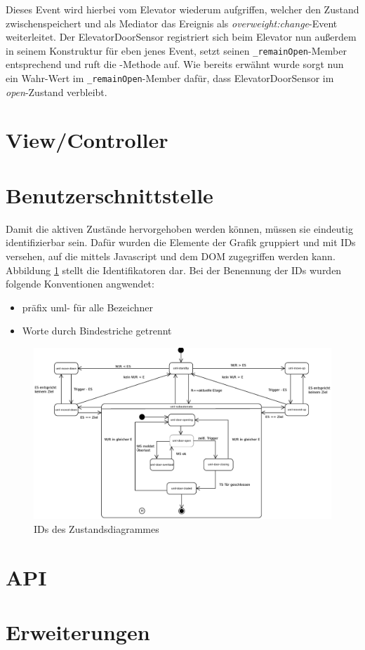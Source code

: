 Dieses Event wird hierbei vom Elevator wiederum aufgriffen, welcher den Zustand zwischenspeichert und als Mediator das Ereignis als \textit{overweight:change}-Event weiterleitet.
Der ElevatorDoorSensor registriert sich beim Elevator nun außerdem in seinem Konstruktur für eben jenes Event, setzt seinen \texttt{_remainOpen}-Member entsprechend und ruft die -Methode auf.
Wie bereits erwähnt wurde sorgt nun ein Wahr-Wert im \texttt{_remainOpen}-Member dafür, dass ElevatorDoorSensor im \textit{open}-Zustand verbleibt.

\section{View/Controller}
\label{imp_vc}

\section{Benutzerschnittstelle}
Damit die aktiven Zustände hervorgehoben werden können, müssen sie eindeutig identifizierbar sein.
Dafür wurden die Elemente der Grafik gruppiert und mit IDs versehen, auf die mittels Javascript und dem \acrshort{DOM} zugegriffen werden kann.
Abbildung \ref{fig:ZD_id_view} stellt die Identifikatoren dar.
Bei der Benennung der IDs wurden folgende Konventionen angwendet:
\begin{itemize}
	\item präfix uml- für alle Bezeichner
	\item Worte durch Bindestriche getrennt
\end{itemize}

\begin{figure}[hbt]
	\centering
	\includegraphics[width=\textwidth]{images/ZDv6_id_view.eps}
	\caption{IDs des Zustandsdiagrammes}%
	\label{fig:ZD_id_view}%
\end{figure}

\section{API}
\label{imp_api}

\section{Erweiterungen}
